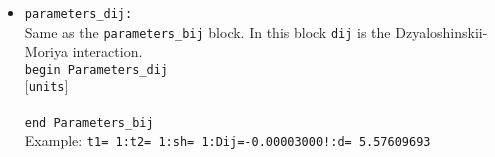 \documentclass[10pt]{report}
\begin{document}
\begin{itemize}
In this block {\tt bij} is the bi-quadratic constant of Hamiltonian.
The only difference is that keyword {\tt sig} does not present here.\\
{\tt begin Parameters\_bij} \\
     \hspace*{0.5cm}$[${\tt units}$]$\\
\hspace*{0.5cm}{\tt    type1:type2:shell:Bij\_param!:distance}\\
{\tt end Parameters\_bij}\\  
Example: {\tt t1=  1:t2=  1:sh= 2:Bij=-0.00004400!:d= 5.57609693} \\ 
\item {\tt parameters\_dij: }                  \\
Same as the {\tt parameters\_bij} block. In this block {\tt dij} is the
Dzyaloshinskii-Moriya interaction.\\
{\tt begin Parameters\_dij} \\
     \hspace*{0.5cm}$[${\tt units}$]$\\
\hspace*{0.5cm}{\tt    type1:type2:shell:Dij\_param!:distance}\\
{\tt end Parameters\_bij}\\  
Example: {\tt t1=  1:t2=  1:sh= 1:Dij=-0.00003000!:d= 5.57609693} \\ 
\end{itemize}
\end{document}

